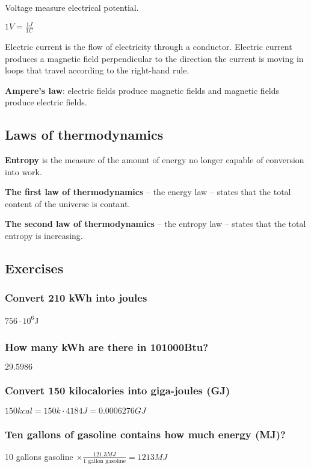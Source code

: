 Voltage measure electrical potential.

$1V = \frac{1J}{1C}$

Electric current is the flow of electricity through a conductor. Electric
current produces a magnetic field perpendicular to the direction the current
is moving in loops that travel according to the right-hand rule.

\textbf{Ampere's law}: electric fields produce magnetic fields and magnetic
fields produce electric fields.

\subsection{Laws of thermodynamics}

\textbf{Entropy} is the measure of the amount of energy no longer capable of
conversion into work.

\textbf{The first law of thermodynamics} -- the energy law -- states that the
total content of the universe is contant.

\textbf{The second law of thermodynamics} -- the entropy law -- states that the
total entropy is increasing.

\subsection{Exercises}

\subsubsection{Convert 210 kWh into joules}
$756 \cdot 10^6$J

\subsubsection{How many kWh are there in 101000Btu?}
$29.5986$

\subsubsection{Convert 150 kilocalories into giga-joules (GJ)}
$150kcal = 150k \cdot 4184J = 0.0006276 GJ$

\subsubsection{Ten gallons of gasoline contains how much energy (MJ)?}
10 gallons gasoline $\times \frac{121.3MJ}{\text{1 gallon gasoline}} =
1213MJ$

